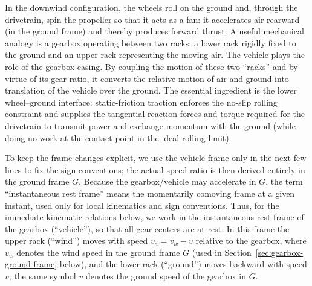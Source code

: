 \documentclass[a4paper]{article}
\begin{document}
In the downwind configuration, the wheels roll on the ground and, through the drivetrain, spin the propeller so that it acts as a fan: it accelerates air rearward (in the ground frame) and thereby produces forward thrust. A useful mechanical analogy is a gearbox operating between two racks: a lower rack rigidly fixed to the ground and an upper rack representing the moving air. The vehicle plays the role of the gearbox casing. By coupling the motion of these two ``racks'' and by virtue of its gear ratio, it converts the relative motion of air and ground into translation of the vehicle over the ground. The essential ingredient is the lower wheel--ground interface: static-friction traction enforces the no-slip rolling constraint and supplies the tangential reaction forces and torque required for the drivetrain to transmit power and exchange momentum with the ground (while doing no work at the contact point in the ideal rolling limit).

To keep the frame changes explicit, we use the vehicle frame only in the next
few lines to fix the sign conventions; the actual speed ratio is then derived
entirely in the ground frame \(G\). Because the gearbox/vehicle may accelerate
in \(G\), the term ``instantaneous rest frame'' means the momentarily comoving
frame at a given instant, used only for local kinematics and sign conventions.
Thus, for the immediate kinematic relations below, we work in the instantaneous
rest frame of the gearbox (``vehicle''), so that all gear centers are at rest.
In this frame the upper rack (``wind'') moves with speed $v_a=v_w-v$ relative to the
gearbox, where $v_w$ denotes the wind speed in the ground frame  \(G\) (used in Section~\ref{sec:gearbox-ground-frame} below),
and the lower rack (``ground'') moves backward with speed $v$; the
same symbol $v$ denotes the ground speed of the gearbox in \(G\).
\end{document}
